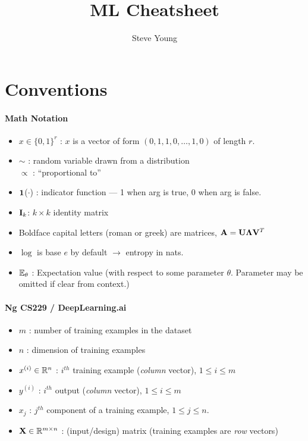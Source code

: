 \documentclass[11pt]{article}
\title{ML Cheatsheet}
\author{Steve Young}
\begin{document}
\maketitle


\section{Conventions}
\label{sec:conv}
\paragraph{Math Notation}
\begin{itemize}
  \item $x \in \{0, 1\}^r$ : $x$ is a vector of form \eeg $(0, 1, 1, 0, \dots, 1, 0)$ of
  length $r$.
  \item $\sim$ : random variable drawn from a distribution\\
  $\propto$ : ``proportional to''
  \item $\mathbf{1}$($\cdot$) : indicator function --- 1 when arg is true, 0 when arg is
  false.
  \item $\mathbf{I}_k$: $k \times k$ identity matrix
  \item Boldface capital letters (roman or greek) are matrices, \eeg $\mathbf{A} = \mathbf{U} \boldsymbol{\Lambda}
  \mathbf{V}^T$ 
  \item $\log$ is base $e$ by default $\to$ entropy in nats.
  \item $\mathbb{E}_{\theta}$ : Expectation value (with respect to some parameter
  $\theta$. Parameter may be omitted if clear from context.)
\end{itemize}

\paragraph{Ng CS229 / DeepLearning.ai}
\begin{itemize}
  \item $m$ : number of training examples in the dataset
  \item $n$ : dimension of training examples
  \item $x^{(i)} \in \mathbb{R}^{n}$ : $i^{th}$ training example (\emph{column} vector),
  $1 \leq i \leq m$
  \item $y^{(i)}$ : $i^{th}$ output (\emph{column} vector), $1 \leq i \leq m$
  \item $x_j$ : $j^{th}$ component of a training example, $1 \leq j \leq n$.
  \item $\mathbf{X} \in \mathbb{R}^{m \times n}$ : (input/design) matrix (training examples are
  \emph{row} vectors)
\end{itemize}
\end{document}
